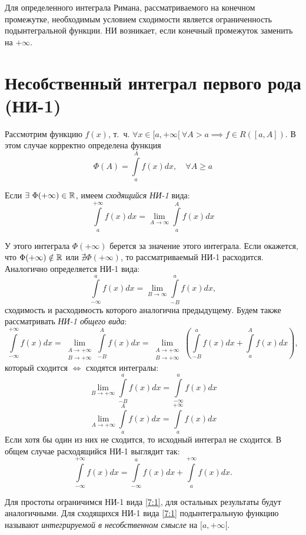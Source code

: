\documentclass[../../main.tex]{subfiles}
\begin{document}
Для определенного интеграла Римана, рассматриваемого на конечном промежутке,
необходимым условием сходимости является ограниченность подынтегральной 
функции.
НИ возникает, если конечный промежуток заменить на $+\infty$.

\section{Несобственный интеграл первого рода (НИ-1)}

Рассмотрим функцию $f(x)$, т.~ч.
$\forall x \in [a, +\infty[ \ \forall A > a \implies f \in R([a, A])$.
В этом случае корректно определена функция
\begin{equation}
    \label{7:1}
    \Phi(A) = \displaystyle\int\limits_a^A f(x)dx,\quad\forall A \geq a
\end{equation}

Если $\exists \ \Phi(+\infty) \in \mathbb{R}$, имеем \emph{сходящийся НИ-1} вида:
\begin{equation}
    \label{7:2}
    \int\limits_a^{+\infty} f(x)dx =
    \lim\limits_{A \to \infty} \int\limits_a^A f(x)dx
\end{equation}

У этого интеграла $\Phi(+\infty)$ берется за значение этого интеграла. Если окажется,
что ${\Phi(+\infty) \notin \mathbb{R}}$ или $ \nexists \Phi(+\infty)$, то рассматриваемый НИ-1 расходится.
Аналогично определяется НИ-1 вида:
\[\int\limits_{-\infty}^a f(x)dx =
\lim\limits_{B \to \infty} \int\limits_{-B}^a f(x)dx, \]
сходимость и расходимость которого аналогична предыдущему.
Будем также рассматривать \emph{НИ-1 общего вида}:
\[ \int\limits_{-\infty}^{+\infty} f(x)dx =
\lim\limits_{\substack{A \to +\infty \\ B \to +\infty}}
\int\limits_{-B}^A f(x)dx =
\lim\limits_{\substack{A \to +\infty \\ B \to +\infty}}
\left( \int\limits_{-B}^a f(x)dx + \int\limits_a^{A} f(x)dx \right), \]
который сходится $\iff$ сходятся интегралы:
\[ \lim\limits_{B \to +\infty} \int\limits_{-B}^a f(x)dx
= \int\limits_{-\infty}^a f(x)dx \]
\[\lim\limits_{A \to +\infty} \int\limits_a^{A} f(x)dx
= \int\limits_a^{+\infty} f(x)dx \]
Если хотя бы один из них не сходится, то исходный интеграл не сходится.
В общем случае расходящийся НИ-1 выглядит так:
\[ \int\limits_{-\infty}^{+\infty} f(x)dx  = \int\limits_{-\infty}^a f(x)dx
+ \int\limits_a^{+\infty} f(x)dx.\]

Для простоты ограничимся НИ-1 вида \eqref{7:1}, для остальных результаты будут
аналогичными. Для сходящихся НИ-1 вида \eqref{7:1} подынтегральную функцию 
называют \emph{интегрируемой в несобственном смысле} на $[a, +\infty[$.
\end{document}
